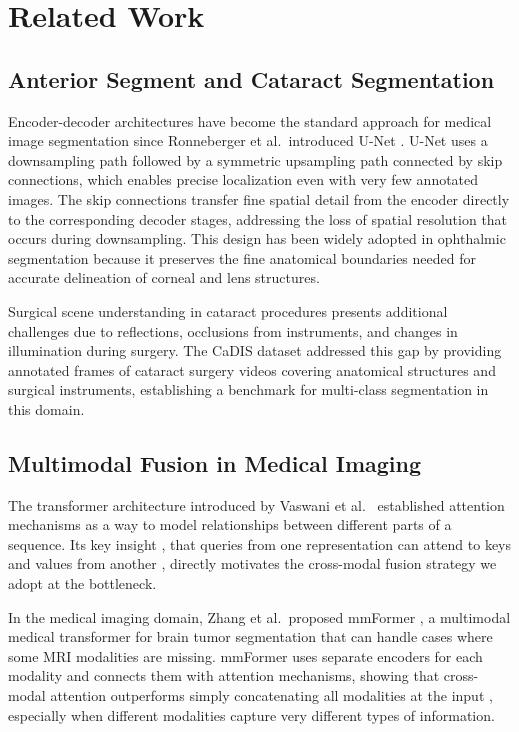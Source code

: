 \section{Related Work}

\subsection{Anterior Segment and Cataract Segmentation}

Encoder-decoder architectures have become the standard approach for medical image segmentation since Ronneberger et al.\ introduced U-Net \cite{ronneberger2015unet}. U-Net uses a downsampling path followed by a symmetric upsampling path connected by skip connections, which enables precise localization even with very few annotated images. The skip connections transfer fine spatial detail from the encoder directly to the corresponding decoder stages, addressing the loss of spatial resolution that occurs during downsampling. This design has been widely adopted in ophthalmic segmentation because it preserves the fine anatomical boundaries needed for accurate delineation of corneal and lens structures.

Surgical scene understanding in cataract procedures presents additional challenges due to reflections, occlusions from instruments, and changes in illumination during surgery. The CaDIS dataset \cite{grammatikopoulou2021cadis} addressed this gap by providing annotated frames of cataract surgery videos covering anatomical structures and surgical instruments, establishing a benchmark for multi-class segmentation in this domain.

\subsection{Multimodal Fusion in Medical Imaging}

The transformer architecture introduced by Vaswani et al.\ \cite{vaswani2017attention} established attention mechanisms as a way to model relationships between different parts of a sequence. Its key insight ,  that queries from one representation can attend to keys and values from another ,  directly motivates the cross-modal fusion strategy we adopt at the bottleneck.

In the medical imaging domain, Zhang et al.\ proposed mmFormer \cite{zhang2022mmformer}, a multimodal medical transformer for brain tumor segmentation that can handle cases where some MRI modalities are missing. mmFormer uses separate encoders for each modality and connects them with attention mechanisms, showing that cross-modal attention outperforms simply concatenating all modalities at the input ,  especially when different modalities capture very different types of information.

